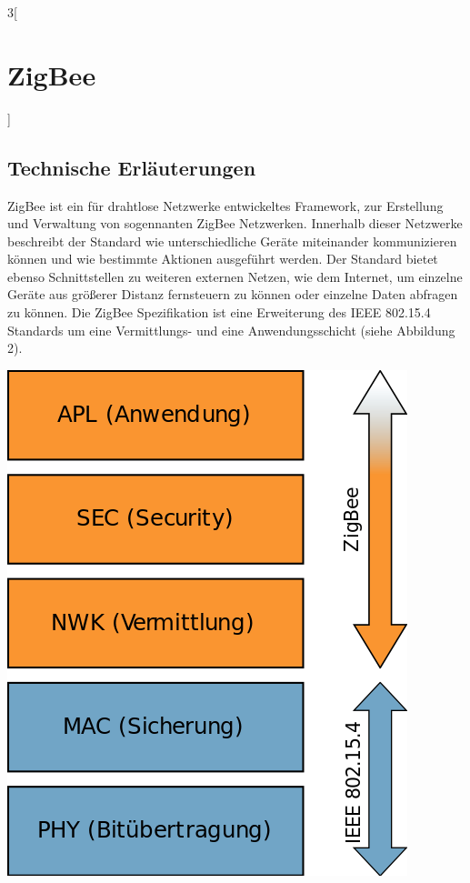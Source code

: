 \begin{multicols}{3}[\section{ZigBee}]
\subsection*{Technische Erläuterungen}
ZigBee ist ein für drahtlose Netzwerke entwickeltes Framework, zur Erstellung und Verwaltung von sogennanten ZigBee Netzwerken. Innerhalb dieser Netzwerke beschreibt der Standard wie unterschiedliche Geräte miteinander kommunizieren können und wie bestimmte Aktionen ausgeführt werden. Der Standard bietet ebenso Schnittstellen zu weiteren externen Netzen, wie dem Internet, um einzelne Geräte aus größerer Distanz fernsteuern zu können oder einzelne Daten abfragen zu können.
Die ZigBee Spezifikation ist eine Erweiterung des IEEE 802.15.4 Standards um eine Vermittlungs- und eine Anwendungsschicht (siehe Abbildung 2). 
\begin{Figure}
\includegraphics[width=\linewidth]{Kapitel/ZigBee/Grafiken/zigbee_stack.png}
\label{fig:vorlage.zemath}
\end{Figure}

\end{multicols}
